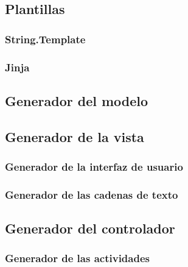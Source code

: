 \subsection{Plantillas}\label{sec:templates}
\subsubsection{String.Template}
\subsubsection{Jinja}\label{sec:jinja}

\subsection{Generador del modelo}\label{sec:generacion}
\subsection{Generador de la vista}
\subsubsection{Generador de la interfaz de usuario}
\subsubsection{Generador de las cadenas de texto}\label{vista:strings}

\subsection{Generador del controlador}
\subsubsection{Generador de las actividades}

